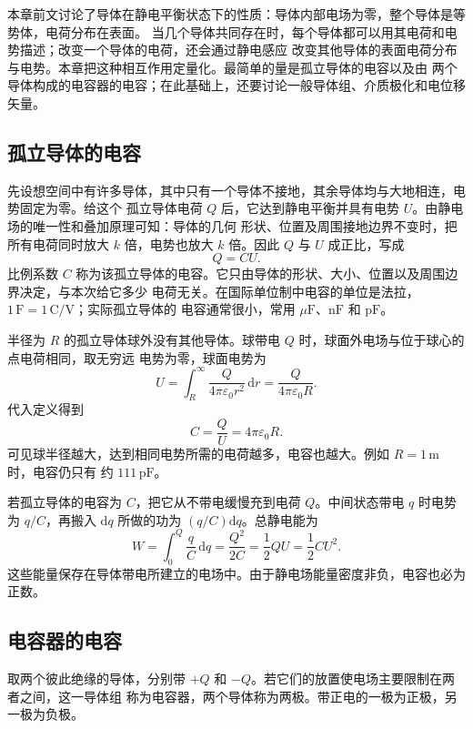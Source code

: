{本章前文讨论了导体在静电平衡状态下的性质：导体内部电场为零，整个导体是等势体，电荷分布在表面。
当几个导体共同存在时，每个导体都可以用其电荷和电势描述；改变一个导体的电荷，还会通过静电感应
改变其他导体的表面电荷分布与电势。本章把这种相互作用定量化。最简单的量是孤立导体的电容以及由
两个导体构成的电容器的电容；在此基础上，还要讨论一般导体组、介质极化和电位移矢量。


\subsection{孤立导体的电容}


先设想空间中有许多导体，其中只有一个导体不接地，其余导体均与大地相连，电势固定为零。给这个
孤立导体电荷 $Q$ 后，它达到静电平衡并具有电势 $U$。由静电场的唯一性和叠加原理可知：导体的几何
形状、位置及周围接地边界不变时，把所有电荷同时放大 $k$ 倍，电势也放大 $k$ 倍。因此 $Q$ 与 $U$
成正比，写成
\begin{equation}
  \boxed{Q=CU}.
\end{equation}
比例系数 $C$ 称为该孤立导体的电容。它只由导体的形状、大小、位置以及周围边界决定，与本次给它多少
电荷无关。在国际单位制中电容的单位是法拉，$1\,\mathrm F=1\,\mathrm C/\mathrm V$；实际孤立导体的
电容通常很小，常用 $\mu\mathrm F$、$\mathrm{nF}$ 和 $\mathrm{pF}$。

半径为 $R$ 的孤立导体球外没有其他导体。球带电 $Q$ 时，球面外电场与位于球心的点电荷相同，取无穷远
电势为零，球面电势为
\[
  U=\int_R^{\infty}\frac{Q}{4\pi\varepsilon_0r^2}\,\mathrm dr
   =\frac{Q}{4\pi\varepsilon_0R}.
\]
代入定义得到
\begin{equation}
  \boxed{C=\frac QU=4\pi\varepsilon_0R}.
\end{equation}
可见球半径越大，达到相同电势所需的电荷越多，电容也越大。例如 $R=1\,\mathrm m$ 时，电容仍只有
约 $111\,\mathrm{pF}$。

若孤立导体的电容为 $C$，把它从不带电缓慢充到电荷 $Q$。中间状态带电 $q$ 时电势为 $q/C$，再搬入
$\mathrm dq$ 所做的功为 $(q/C)\mathrm dq$。总静电能为
\begin{equation}
  \boxed{W=\int_0^Q\frac qC\,\mathrm dq
  =\frac{Q^2}{2C}=\frac12QU=\frac12CU^2}.
\end{equation}
这些能量保存在导体带电所建立的电场中。由于静电场能量密度非负，电容也必为正数。


\subsection{电容器的电容}


取两个彼此绝缘的导体，分别带 $+Q$ 和 $-Q$。若它们的放置使电场主要限制在两者之间，这一导体组
称为电容器，两个导体称为两极。带正电的一极为正极，另一极为负极。

}
